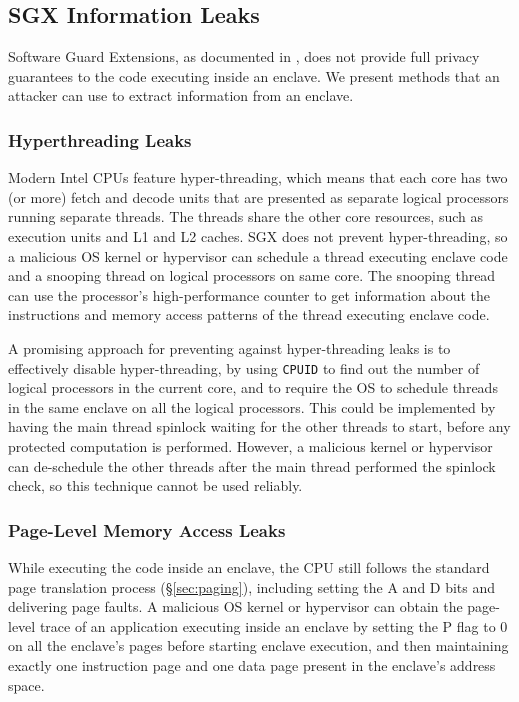 \subsection{SGX Information Leaks}
\label{sec:sgx_leaks}

Software Guard Extensions, as documented in \cite{intel2013sgxmanual}, does not
provide full privacy guarantees to the code executing inside an enclave. We
present methods that an attacker can use to extract information from an
enclave.

\subsubsection{Hyperthreading Leaks}

Modern Intel CPUs feature hyper-threading, which means that each core has two
(or more) fetch and decode units that are presented as separate logical
processors running separate threads. The threads share the other core
resources, such as execution units and L1 and L2 caches. SGX does not prevent
hyper-threading, so a malicious OS kernel or hypervisor can schedule a thread
executing enclave code and a snooping thread on logical processors on same
core. The snooping thread can use the processor's high-performance counter
\cite{petters1999making} to get information about the instructions and memory
access patterns of the thread executing enclave code.

A promising approach for preventing against hyper-threading leaks is to
effectively disable hyper-threading, by using \texttt{CPUID} to find out the
number of logical processors in the current core, and to require the OS to
schedule threads in the same enclave on all the logical processors. This could
be implemented by having the main thread spinlock waiting for the other threads
to start, before any protected computation is performed. However, a malicious
kernel or hypervisor can de-schedule the other threads after the main thread
performed the spinlock check, so this technique cannot be used reliably.

\subsubsection{Page-Level Memory Access Leaks}

While executing the code inside an enclave, the CPU still follows the standard
page translation process (\S \ref{sec:paging}), including setting the A and D
bits and delivering page faults. A malicious OS kernel or hypervisor can
obtain the page-level trace of an application executing inside an enclave by
setting the P flag to 0 on all the enclave's pages before starting enclave
execution, and then maintaining exactly one instruction page and one data page
present in the enclave's address space.

